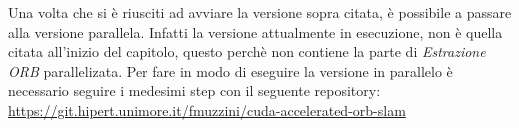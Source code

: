 \documentclass[12pt,a4paper]{report}
\begin{document}
\newline

Una volta che si è riusciti ad avviare la versione sopra citata, è possibile a passare alla versione parallela.
Infatti la versione attualmente in esecuzione, non è quella citata all'inizio del capitolo, questo perchè non contiene la parte di \textit{Estrazione ORB} parallelizata.
Per fare in modo di eseguire la versione in parallelo è necessario seguire i medesimi step con il seguente repository: \url{https://git.hipert.unimore.it/fmuzzini/cuda-accelerated-orb-slam}


\end{document}
